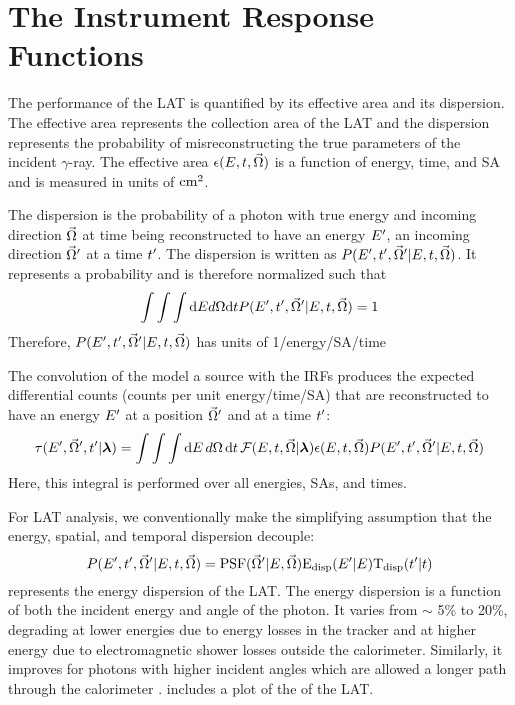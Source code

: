\section{The  Instrument Response Functions}

The performance of the \ac{LAT} is quantified by its effective area and
its dispersion. The effective area represents the collection area of the
\ac{LAT} and the dispersion represents the probability of misreconstructing
the true parameters of the incident $\gamma$-ray.
The effective area $\epsilon(E,t,\vec\Omega)$ is a
function of energy, time, and \ac{SA} and is measured in units of $\text{cm}^2$.

The dispersion is the probability of a photon with true energy
\energy and incoming direction $\vec\Omega$ at time \time being
reconstructed to have an energy $E'$, an incoming direction
$\vec\Omega'$ at a time $t'$.  The dispersion is written as
$P(E',t',\vec\Omega'|E,t,\vec\Omega)$.
It represents a probability and is therefore normalized such that
\begin{equation}
  \int \int \int \text{d}E d\Omega \text{d}t 
  P(E',t',\vec\Omega'|E,t,\vec\Omega) = 1
\end{equation}
Therefore,
$P(E',t',\vec\Omega'|E,t,\vec\Omega)$
has units of 1/energy/\acs{SA}/time

The convolution of the model a source with the \acp{IRF} produces the
expected differential counts (counts per unit energy/time/\acs{SA})
that are reconstructed to have an energy $E'$ at a position
$\vec\Omega'$ and at a time $t'$:
\begin{equation}
  \eqnlabel{eventrate}
  \eventrate(\energy',\solidangle',\time'|\modelparams)
  = \int \int \int \denergy \, \dsolidangle \, \dtime \,
  \fluxdensity(\energy,\time,\vec\Omega|\modelparams) 
  \effectivearea(\energy,\time,\solidangle) \dispersion(\energy',\time',\solidangle'|\energy,\time,\solidangle)
\end{equation}
Here, this integral is performed over all energies, \acp{SA}, and times.

For \ac{LAT} analysis, we conventionally make the simplifying assumption that
the energy, spatial, and temporal dispersion decouple:
\begin{equation}
  P(E',t',\vec\Omega'|E,t,\vec\Omega) = 
  \text{PSF}(\vec\Omega'|E,\vec\Omega) \text{E}_\text{disp}(E'|E) \text{T}_\text{disp}(t'|t)
\end{equation}
\edisp represents the energy dispersion of the \ac{LAT}. The energy
dispersion is a function of both the incident energy and angle of
the photon. It varies from $\sim$ 5\% to 20\%, degrading at lower
energies due to energy losses in the tracker and at higher energy due
to electromagnetic shower losses outside the calorimeter. Similarly,
it improves for photons with higher incident angles which are allowed a
longer path through the calorimeter \citep{ackermann_2012a_fermi-large}.
 includes a plot of the \edisp of the \ac{LAT}.

